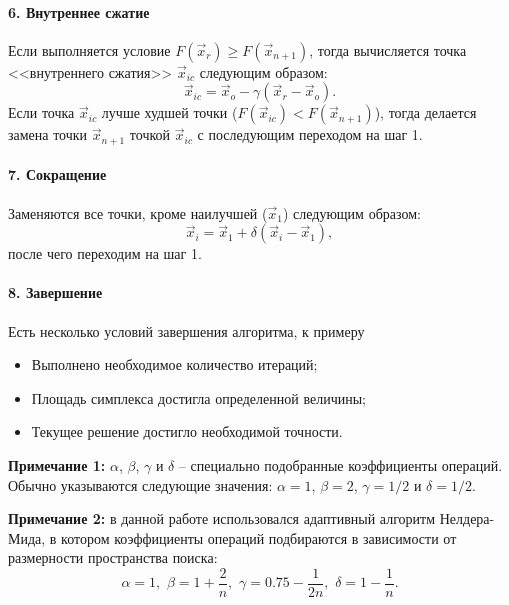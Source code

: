 \paragraph{6. Внутреннее сжатие}
\noindent\indent Если выполняется условие $F(\vec{x}_r) \geq F(\vec{x}_{n+1})$,
тогда вычисляется точка <<внутреннего сжатия>> $\vec{x}_{ic}$ следующим образом:
\begin{equation}
  \vec{x}_{ic} = \vec{x}_o - \gamma(\vec{x}_{r} - \vec{x}_o).
\end{equation}
Если точка $\vec{x}_{ic}$ лучше худшей точки ($F(\vec{x}_{ic}) < F(\vec{x}_{n+1})$),
тогда делается замена точки $\vec{x}_{n+1}$ точкой $\vec{x}_{ic}$ с последующим
переходом на шаг 1.
\paragraph{7. Сокращение}
\noindent\indent Заменяются все точки, кроме наилучшей ($\vec{x}_1$) следующим образом:
\begin{equation}
  \vec{x}_i = \vec{x}_1 + \delta(\vec{x}_i - \vec{x}_1),
\end{equation}
после чего переходим на шаг 1.\par
\paragraph{8. Завершение}
\noindent\indent Есть несколько условий завершения алгоритма, к примеру\par
\begin{itemize}
  \item Выполнено необходимое количество итераций;
  \item Площадь симплекса достигла определенной величины;
  \item Текущее решение достигло необходимой точности.
\end{itemize}\par
  \textbf{Примечание 1:} $\alpha$, $\beta$, $\gamma$ и $\delta$ -- специально подобранные
коэффициенты операций. Обычно указываются следующие значения:
$\alpha = 1$, $\beta = 2$, $\gamma = 1/2$ и $\delta = 1/2$.\par
    \textbf{Примечание 2:} в данной работе использовался адаптивный алгоритм
Нелдера-Мида, в котором коэффициенты операций подбираются в зависимости от
размерности пространства поиска:
\begin{equation}
    \alpha = 1,\,\, \beta = 1 + \frac{2}{n},\,\,
    \gamma = 0.75 - \frac{1}{2n},\,\, \delta = 1 - \frac{1}{n}.
\end{equation}
